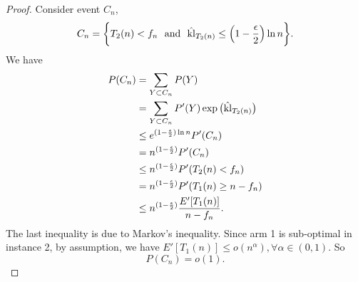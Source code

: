 \begin{proof}
    Consider event $C_n$,
    \begin{align}
        C_n=\bigg\{ T_2(n)<f_n
            ~~\text{and}~~
            \hat {{\mathop{\mathrm{kl}}}}_{T_2(n)} \le \Big(1-\frac{\epsilon}{2}\Big)\ln n \bigg\}.
    \end{align}
    We have
    \begin{align}
        P(C_n)
            &= \sum_{Y\subset C_n} P(Y) \\
            &= \sum_{Y\subset C_n} P'(Y) \exp\big(\hat{{\mathop{\mathrm{kl}}}}_{T_2(n)}\big) \\
            &\le e^{(1-\frac{\epsilon}{2})\ln n} P'(C_n) \\
            &= n^{(1-\frac{\epsilon}{2})} P'(C_n) \\
            &\le n^{(1-\frac{\epsilon}{2})} P'(T_2(n)<f_n) \\
            &= n^{(1-\frac{\epsilon}{2})} P'(T_1(n)\ge n-f_n) \\
            &\le n^{(1-\frac{\epsilon}{2})} \frac{E'[T_1(n)]}{n-f_n}.
    \end{align}
    The last inequality is due to Markov's inequality.
    Since arm 1 is sub-optimal in instance 2,
    by assumption, we have $E'[T_1(n)]\le o(n^\alpha), \forall \alpha\in(0,1)$.
    So
    \begin{equation}
        P(C_n)=o(1). \label{eq:2_52}
    \end{equation}


\end{proof}
